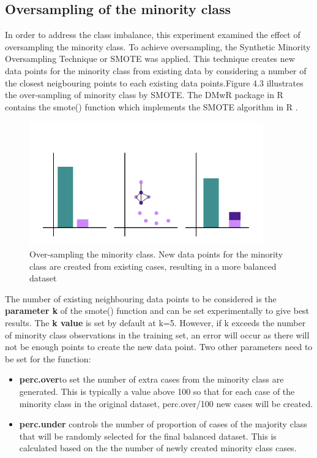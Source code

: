 \subsection{Oversampling of the minority class}
In order to address the class imbalance, this experiment examined the effect of oversampling the minority class. To achieve oversampling, the Synthetic Minority Oversampling Technique or SMOTE \citep{Chawla:2002ty} was applied. \newline 
This technique creates new data points for the minority class from existing data by considering a number of the closest neigbouring points to each existing data points.Figure 4.3 illustrates the over-sampling of minority class by SMOTE. The DMwR package in R contains the smote() function which implements the SMOTE algorithm in R \citep{Anonymous:bPzTqa7x}.\newline

\begin{figure}[!htbp]
    \centering
    \includegraphics[width=0.9\textwidth]{ThesisTemplate/usingLatex/chapter4Images/Figure2002.png}
    \caption{Over-sampling the minority class. New data points for the minority class are created from existing cases, resulting in a more balanced dataset}
    \label{fig:OverSample}
\end{figure}


The number of existing neighbouring data points to be considered is the \textbf{parameter k} of the smote() function and can be set experimentally to give best results.\newline
The \textbf{k value} is set by default at k=5. However, if k exceeds the number of minority class observations in the training set, an error will occur as there will not be enough points to create the new data point.\newline
Two other parameters need to be set for the function: 
\begin{itemize}
    \item \textbf{perc.over}to set the number of extra cases from the minority class are generated. This is typically a value above 100 so that for each case of the minority class in the original dataset, perc.over/100 new cases will be created.
    \item \textbf{perc.under} controls the number of proportion of cases of the majority class that will be randomly selected for the final balanced dataset. This is calculated based on the the number of newly created minority class cases. 
\end{itemize}

